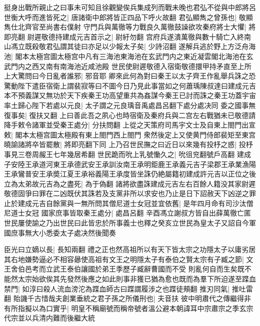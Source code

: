 挺身出戰所親止之曰事未可知且徐觀變俟兵集成列而戰未晚也君弘不從與中郎將呂世衡大呼而進皆死之|{
	唐諸衛中郎將皆正四品下呼火故翻}
君弘顯雋之曾孫也|{
	敬顯雋仕北齊官至尚書右僕射}
守門兵與萬徹等力戰良久萬徹鼓譟欲攻秦府將士大懼|{
	將即亮翻}
尉遲敬德持建成元吉首示之|{
	尉紆勿翻}
宫府兵遂潰萬徹與數十騎亡入終南山馮立既殺敬君弘謂其徒曰亦足以少報太子矣|{
	少詩沼翻}
遂解兵逃於野上方泛舟海池|{
	閣本太極宫圖太極宫中凡有三海池東海池在玄武門内之東近凝雲閣北海池在玄武門内之西又南有南海池近咸池殿}
世民使尉遲敬德入宿衛敬德擐甲持矛直至上所上大驚問曰今日亂者誰邪|{
	邪音耶}
卿來此何為對曰秦王以太子齊王作亂舉兵誅之恐驚動陛下遣臣宿衛上謂裴寂等曰不圖今日乃見此事當如之何蕭瑀陳叔達曰建成元吉本不預義謀又無功於天下疾秦王功高望重共為姦謀今秦王已討而誅之秦王功蓋宇宙率土歸心陛下若處以元良|{
	太子謂之元良瑀音禹處昌呂翻下處分處决同}
委之國事無復事矣|{
	復扶又翻}
上曰善此吾之夙心也時宿衛及秦府兵與二宫左右戰猶未已敬德請降手敕令諸軍並受秦王處分|{
	分扶問翻}
上從之天策府司馬宇文士及自東上閤門出宣敕|{
	閣本太極宫圖太極殿有東上閤門西上閤門}
衆然後定上又使黄門侍郎裴矩至東宫曉諭諸將卒皆罷散|{
	將即亮翻下同}
上乃召世民撫之曰近日以來幾有投杼之惑|{
	投杼事見三卷周赧王七年幾居希翻}
世民跪而吮上乳號慟久之|{
	吮徂兖翻號戶高翻}
建成子安陸王承道河東王承德武安王承訓汝南王承明鉅鹿王承義元吉子梁郡王承業漁陽王承鸞普安王承奬江夏王承裕義陽王承度皆坐誅仍絶屬籍初建成許元吉以正位之後立為太弟故元吉為之盡死|{
	為于偽翻}
諸將欲盡誅建成元吉左右百餘人籍没其家尉遲敬德固爭曰罪在二凶既伏其誅若及支黨非所以求安也乃止是日下詔赦天下凶逆之罪止於建成元吉自餘黨與一無所問其僧尼道士女冠並宜依舊|{
	是年四月命有司沙汰僧尼道士女冠}
國家庶事皆取秦王處分|{
	處昌呂翻}
辛酉馮立謝叔方皆自出薛萬徹亡匿世民屢使諭之乃出世民曰此皆忠於所事義士也釋之癸亥立世民為皇太子又詔自今軍國庶事無大小悉委太子處决然後聞奏

臣光曰立嫡以長|{
	長知兩翻}
禮之正也然高祖所以有天下皆太宗之功隱太子以庸劣居其右地嫌勢逼必不相容曏使高祖有文王之明隱太子有泰伯之賢太宗有子臧之節|{
	文王舍伯邑考而立武王泰伯讓國於弟王季歷子臧辭曹國而不受}
則亂何自而生矣既不能然太宗始欲俟其先發然後應之如此則事非獲已猶為愈也既而為羣下所迫遂至蹀血禁門|{
	如淳曰殺人流血滂沱為蹀血師古曰蹀謂履涉之也蹀徒頰翻}
推刃同氣|{
	推吐雷翻}
貽譏千古惜哉夫創業垂統之君子孫之所儀刑也|{
	夫音扶}
彼中明肅代之傳繼得非有所指擬以為口實乎|{
	明皇不稱廟號而稱帝號者溫公避本朝諱耳中宗肅宗之季玄宗代宗並以兵清内難而後繼大統}


